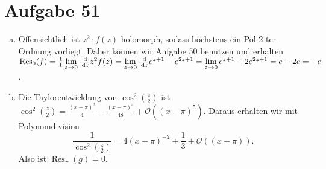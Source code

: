 \documentclass{article}
\theoremstyle{definition}
\newcommand{\dv}[2]{\frac{\d #1 }{\d #2 }}
\begin{document}
\newcommand{\Res}[2][]{\operatorname{Res}_{#1}\!\left(#2\right)}
\section*{Aufgabe 51}
\begin{enumerate}[(a)]
    \item Offensichtlich ist $z^2 \cdot f(z)$ holomorph, sodass höchstens ein Pol 2-ter Ordnung vorliegt. Daher können wir Aufgabe 50 benutzen und erhalten $\Res[0]{f} = \frac{1}{1} \lim\limits_{z\to 0} \dv{}{z}z^2f(z) = \lim\limits_{z\to 0} \dv{}{z} e^{z+1} - e^{2z + 1} = \lim\limits_{z\to 0} e^{z+1} - 2e^{2z+1}  = e - 2e = -e$.
    \item Die Taylorentwicklung von $\cos^2(\frac{z}{2})$ ist $\cos^2(\frac{z}{2}) = \frac{(x-\pi)^2}{4} - \frac{(x-\pi)^4}{48} + \mathcal{O}((x-\pi)^5)$. Daraus erhalten wir mit Polynomdivision
    \[
        \frac{1}{\cos^2(\frac{z}{2})} = 4(x-\pi)^{-2} + \frac{1}{3} + \mathcal{O}((x-\pi)).
    \]
    Also ist $\Res[\pi]{g} = 0$. 
\end{enumerate}
\end{document}
